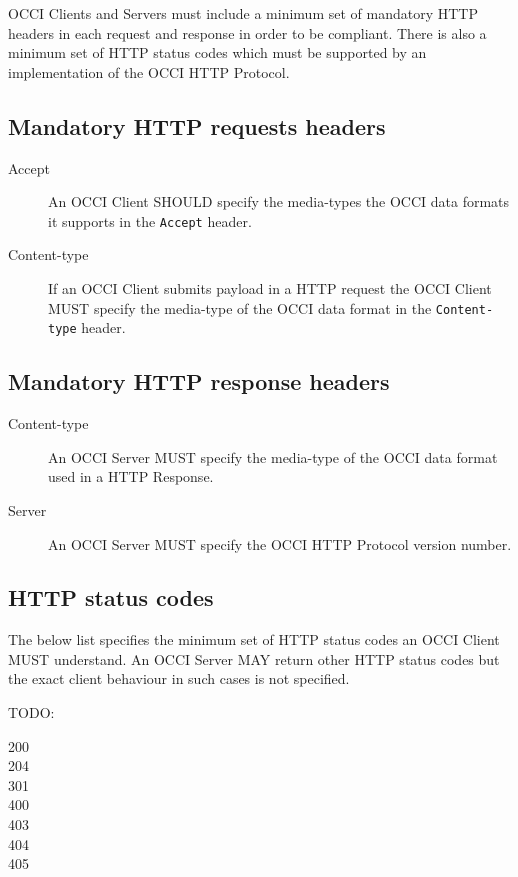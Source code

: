 \documentclass[10pt,a4paper]{article}
\begin{document}
OCCI Clients and Servers must include a minimum set of mandatory HTTP headers
in each request and response in order to be compliant.
There is also a minimum set of HTTP status codes which must be supported by
an implementation of the OCCI HTTP Protocol.

\subsection{Mandatory HTTP requests headers}

\begin{description}
\item[Accept] An OCCI Client SHOULD specify the media-types the OCCI data
formats it supports in the {\tt Accept} header.

\item[Content-type] If an OCCI Client submits payload in a HTTP request
the OCCI Client MUST specify the media-type of the OCCI data format
in the {\tt Content-type} header.
\end{description}

\subsection{Mandatory HTTP response headers}

\begin{description}
\item[Content-type] An OCCI Server MUST specify the media-type of the OCCI data
format used in a HTTP Response.
\item[Server] An OCCI Server MUST specify the OCCI HTTP Protocol version number.
\end{description}

\subsection{HTTP status codes}

The below list specifies the minimum set of HTTP status codes an OCCI Client MUST
understand. An OCCI Server MAY return other HTTP status codes but the exact client
behaviour in such cases is not specified.

TODO:

\begin{description}
\item[200]
\item[204]
\item[301]
\item[400]
\item[403]
\item[404]
\item[405]
\end{description}
\end{document}
